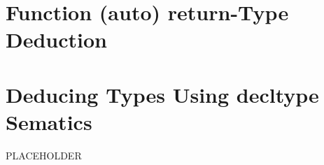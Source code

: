 \newpage
{}
 \section[Deduced Return Type]{Function ({\SecCode auto}) {\SecCode return}-Type Deduction}\label{Function-Return-Type-Deduction}
\renewcommand{\cppxx}{C++14}


\newpage
\section[{\tt decltypeauto}]{Deducing Types Using {\SecCode decltype} Sematics}\label{decltypeauto}
%
PLACEHOLDER

